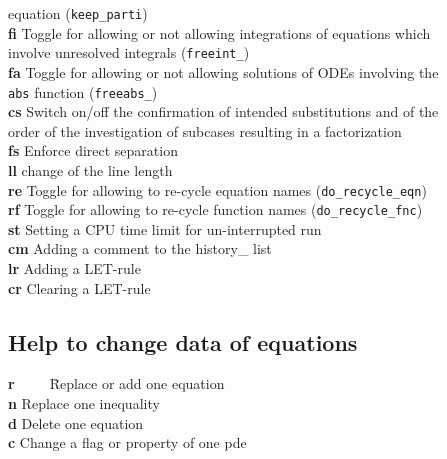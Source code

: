 \documentclass[12pt]{article}
\begin{document}
\begin{tabbing}
                        equation ({\tt keep\_parti}) \\
  {\bf fi}   \> Toggle for allowing or not allowing
                        integrations of equations which \\
             \> involve unresolved integrals ({\tt freeint\_})  \\
  {\bf fa}   \> Toggle for allowing or not allowing solutions of ODEs
                        involving the \\
             \> {\tt abs} function ({\tt freeabs\_})  \\
  {\bf cs}   \> Switch on/off the confirmation of intended substitutions
                and of the \\
             \> order of the investigation of subcases 
                resulting in a factorization \\
  {\bf fs}   \> Enforce direct separation \\
  {\bf ll}   \> change of the line length \\
  {\bf re}   \> Toggle for allowing to re-cycle equation names
             ({\tt do\_recycle\_eqn})  \\
  {\bf rf}   \> Toggle for allowing to re-cycle function names
             ({\tt do\_recycle\_fnc}) \\
  {\bf st}   \> Setting a CPU time limit for un-interrupted run \\
  {\bf cm}   \> Adding a comment to the history\_ list \\
  {\bf lr}   \> Adding a LET-rule \\
  {\bf cr}   \> Clearing a LET-rule
\end{tabbing}

\subsection{Help to change data of equations} 
\begin{tabbing}
  {\bf r}\ \ \ \ \ \= Replace or add one equation \\
  {\bf n}    \> Replace one inequality      \\
  {\bf d}    \> Delete one equation         \\             
  {\bf c}    \> Change a flag or property of one pde  
\end{tabbing}
\end{document}
